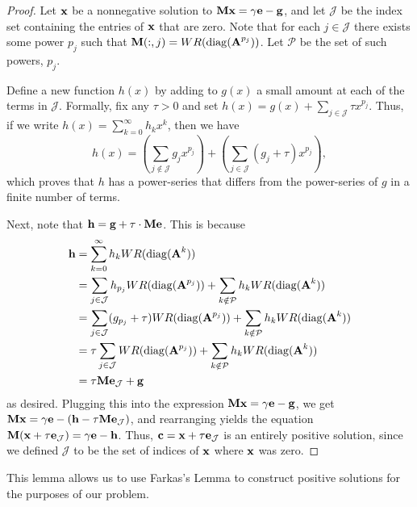 
\begin{proof}
  Let $\textbf{x}$ be a nonnegative solution to $\textbf{M}\textbf{x} = \gamma\textbf{e} - \textbf{g}$, and
  let $\mathcal{J}$ be the index set containing the entries of $\textbf{x}$ that are zero. Note that for each $j \in \mathcal{J}$ there exists some power $p_j$ such that $\textbf{M}(:,j) = WR(\operatorname{diag}(\textbf{A}^{p_j}))$. Let $\mathcal{P}$ be the set of such powers, $p_j$.

  Define a new function $h(x)$ by adding to $g(x)$ a small amount at each of the terms in $\mathcal{J}$. Formally, fix any $\tau >0$ and set $h(x) = g(x) + \sum_{j \in \mathcal{J}} \tau x^{p_j}$. Thus, if we write $h(x) = \sum_{k=0}^{\infty} h_k x^k$, then we have
  \[
  h(x) = \left(\sum_{j \notin \mathcal{J}} g_j x^{p_j}\right) + \left( \sum_{j \in \mathcal{J}} (g_j + \tau) x^{p_j}\right),
  \]
  which proves that $h$ has a power-series that differs from the power-series of $g$ in a finite number of terms.

  Next, note that $\textbf{h} = \textbf{g} + \tau \cdot \textbf{M} \textbf{e}$. This is because
  \begin{align}
    \textbf{h} &= \sum_{k=0}^{\infty} h_k WR(\operatorname{diag}(\textbf{A}^k)) \\
        &= \sum_{j \in \mathcal{J} } h_{p_j} WR(\operatorname{diag}(\textbf{A}^{p_j})) +  \sum_{k \notin \mathcal{P} } h_k WR(\operatorname{diag}(\textbf{A}^k)) \\
        &= \sum_{j \in \mathcal{J} } (g_{p_j} + \tau) WR(\operatorname{diag}(\textbf{A}^{p_j})) +  \sum_{k \notin \mathcal{P} } h_k WR(\operatorname{diag}(\textbf{A}^k)) \\
        &= \tau \sum_{j \in \mathcal{J} } WR(\operatorname{diag}(\textbf{A}^{p_j})) + \sum_{k \notin \mathcal{P} } h_k WR(\operatorname{diag}(\textbf{A}^k)) \\
        &= \tau \textbf{M}\textbf{e}_{\mathcal{J}} +\textbf{g}
  \end{align}
  as desired.
  Plugging this into the expression $\textbf{M} \textbf{x} = \gamma\textbf{e} - \textbf{g}$, we get $\textbf{M} \textbf{x} = \gamma\textbf{e} - (\textbf{h} - \tau \textbf{M}\textbf{e}_{\mathcal{J}})$, and rearranging yields the equation
  $\textbf{M}(\textbf{x}+\tau \textbf{e}_{\mathcal{J}}) = \gamma\textbf{e} - \textbf{h}$.
  Thus, $\textbf{c} = \textbf{x} + \tau\textbf{e}_{\mathcal{J}}$ is an entirely positive solution, since we defined $\mathcal{J}$ to be the set of indices of $\textbf{x}$ where $\textbf{x}$ was zero.

\end{proof}

This lemma allows us to use Farkas's Lemma to construct positive solutions for the purposes of our problem.

